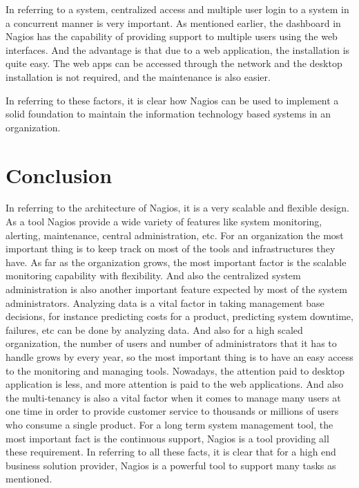 \documentclass[9pt,twocolumn,twoside]{styles/osajnl}
\begin{document}
In referring to a system, centralized access and multiple user login to a system in a concurrent manner is very important. As mentioned earlier, the dashboard in Nagios has the capability of providing support to multiple users using the web interfaces. And the advantage is that due to a web application, the installation is quite easy. The web apps can be accessed through the network and the desktop installation is not required, and the maintenance is also easier.

In referring to these factors, it is clear how Nagios can be used to implement a solid foundation to maintain the information technology based systems in an organization.

\section{Conclusion}

In referring to the architecture of Nagios, it is a very scalable and flexible design. As a tool Nagios provide a wide variety of features like system monitoring, alerting, maintenance, central administration, etc. For an organization the most important thing is to keep track on most of the tools and infrastructures they have. As far as the organization grows, the most important factor is the scalable monitoring capability with flexibility. And also the centralized system administration is also another important feature expected by most of the system administrators. Analyzing data is a vital factor in taking management base decisions, for instance predicting costs for a product, predicting system downtime, failures, etc can be done by analyzing data. And also for a high scaled organization, the number of users and number of administrators that it has to handle grows by every year, so the most important thing is to have an easy access to the monitoring and managing tools. Nowadays, the attention paid to desktop application is less, and more attention is paid to the web applications. And also the multi-tenancy is also a vital factor when it comes to manage many users at one time in order to provide customer service to thousands or millions of users who consume a single product. For a long term system management tool, the most important fact is the continuous support, Nagios is a tool providing all these requirement. In referring to all these facts, it is clear that for a high end business solution provider, Nagios is a powerful tool to support many tasks as mentioned. 
\end{document}
